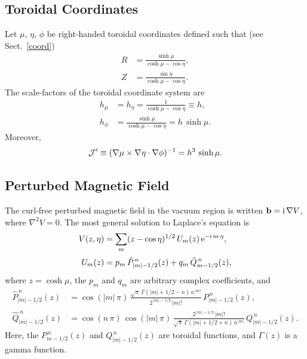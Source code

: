 \documentclass[12pt,prb,aps]{revtex4-1}
\begin{document}
\subsection{Toroidal Coordinates}
Let $\mu$, $\eta$, $\phi$ be right-handed toroidal coordinates defined such that (see Sect.~\ref{coord})
\begin{align}
R &= \frac{\sinh\mu}{\cosh\mu-\cos\eta},\\[0.5ex]
Z&=\frac{\sin\eta}{\cosh\mu-\cos\eta}.
\end{align}
The scale-factors of the toroidal coordinate system are
\begin{align}
h_\mu&=h_\eta= \frac{1}{\cosh\mu-\cos\eta}\equiv h,\\[0.5ex]
h_\phi &= \frac{\sinh\mu}{\cosh\mu-\cos\eta} = h\,\sinh\mu.
\end{align}
Moreover, 
\begin{equation}
{\cal J}' \equiv (\nabla\mu\times\nabla\eta\cdot\nabla\phi)^{-1}= h^3\,\sinh\mu.
\end{equation}

\subsection{Perturbed Magnetic Field}
The curl-free perturbed magnetic field in the vacuum region is written ${\bf b} = {\rm i}\,\nabla V$,
where
$\nabla^2 V =0$.
The most general solution to Laplace's equation is
\begin{align}
V(z,\eta)&= \sum_m (z-\cos\eta)^{1/2}\,U_m(z)\,{\rm e}^{-{\rm i}\,m\,\eta}, \\[0.5ex]
U_m(z) &= p_m\,\hat{P}_{|m|-1/2}^{\,n}(z)+q_m\,\hat{Q}_{m-1/2}^{\,n}(z),
\end{align}
where  $z=\cosh\mu$, the $p_m$ and $q_m$ are arbitrary complex coefficients, and 
\begin{align}\label{e21}
\hat{P}_{|m|-1/2}^{\,n}(z) &= \cos(|m|\,\pi)\,\frac{\sqrt{\pi}\,\Gamma(|m|+1/2-n)\,a^{\,|m|}}{2^{\,|m|-1/2}\,|m|!}\,P_{|m|-1/2}^{\,n}(z),\\[0.5ex]
\hat{Q}_{|m|-1/2}^{\,n}(z)&= \cos(n\,\pi)\,\cos(|m|\,\pi)\,\frac{2^{\,|m|-1/2}\,|m|!}{\sqrt{\pi}\,\Gamma(|m|+1/2+n)\,a^{\,|m|}}\,Q_{|m|-1/2}^{\,n}(z).\label{e22}
\end{align}
Here,  the $P_{m-1/2}^{\,n}(z)$  and $Q_{|m|-1/2}^{\,n}(z)$ are toroidal functions,\cite{abrama}  and $\Gamma(z)$ is a
gamma function.\cite{abramb}
\end{document}
